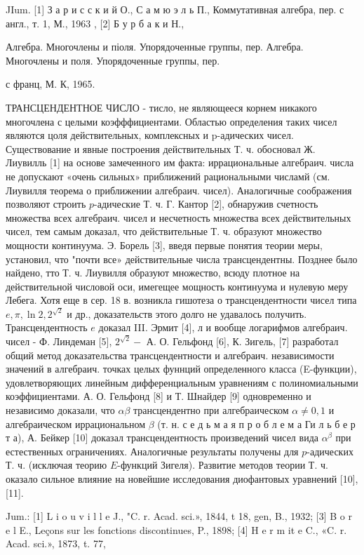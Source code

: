 \documentclass[10pt]{article}
\begin{document}
JIum. [1] З а р и с с к и й О., С а м ю э л ь П., Коммутативная алгебра, пер. с англ., т. 1, М., 1963 , [2] Б у р б а к и Н.,

Алгебра. Многочлены и піоля. Упорядоченные группы, пер. Алгебра. Многочлены и поля. Упорядоченные группы, пер.

с франц, М. К, 1965.



ТРАНСЦЕНДЕНТНОЕ ЧИСЛО - тисло, не являющееся корнем никакого многочлена с целыми коэфффициентами. Областью определения таких чисел являются цоля действительных, комплексных и p-адических чисел. Существование и явные построения действительных Т. ч. обосновал Ж. Лиувилль [1] на основе замеченного им факта: иррациональные алгебраич. числа не допускают «очень сильных» приближений рациональными числамй (см. Лиувилля теорема о приближении алгебраич. чисел). Аналогичные соображения позволяют строить $p$-адические Т. ч. Г. Кантор [2], обнаружив счетность множества всех алгебраич. чисел и несчетность множества всех действительных чисел, тем самым доказал, что действительные Т. ч. образуют множество мощности континуума. Э. Борель [3], введя первые понятия теории меры, установил, что "почти все» действительные числа трансцендентны. Позднее было найдено, тто Т. ч. Лиувилля образуют множество, всюду плотное на действительной числовой оси, имегещее мощность континуума и нулевую меру Лебега. Хотя еще в сер. 18 в. возникла гишотеза о трансцендентности чисел типа $e, \pi, \ln 2,2^{\sqrt{2}}$ и др., доказательств этого долго не удавалось получить. Трансцендентность $e$ доказал III. Эрмит [4], л и вообще логарифмов алгебраич. чисел - Ф. Линдеман [5], $2^{\sqrt{2}}-$ А. О. Гельфонд [6], К. Зигель, [7] разработал общий метод доказательства трансцендентности и алгебраич. независимости значений в алгебраич. точках целых фуннций определенного класса (E-функции), удовлетворяющих линейным дифференциальным уравнениям с полиномиальными коэффициентами. А. О. Гельфонд [8] и Т. Шнайдер [9] одновременно и независимо доказали, что $\alpha \beta$ трансцендентно при алгебраическом $\alpha \neq 0,1$ и алгебраическом иррациональном $\beta$ (т. н. с е д ь м а я п р о б л е м а Ги л ь б е р т а), А. Бейкер [10] доказал трансцендентность произведений чисел вида $\alpha^{\beta}$ при естественных ограничениях. Аналогичные результаты получены для $p$-адических Т. ч. (исключая теорию $E$-функций Зигеля). Развитие методов теории Т. ч. оказало сильное влияние на новейшие исследования диофантовых уравнений [10], [11].



Jum.: [1] L i o u v i l l e J., "C. r. Acad. sci.», 1844, t 18, gen, B., 1932; [3] B o r e l E., Leçons sur les fonctions discontinues, P., 1898; [4] H e r m it e C., «C. r. Acad. sci.», 1873, t. 77,
\end{document}

